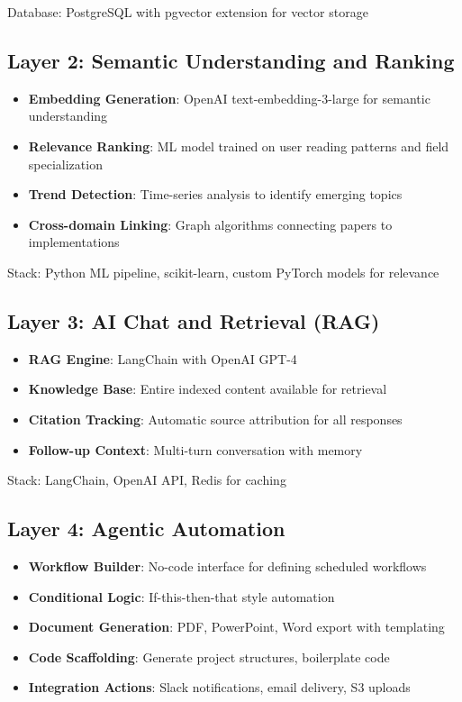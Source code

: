 \documentclass{report}
\begin{document}
Database: PostgreSQL with pgvector extension for vector storage

\subsection{Layer 2: Semantic Understanding and Ranking}

\begin{itemize}
    \item \textbf{Embedding Generation}: OpenAI text-embedding-3-large for semantic understanding
    \item \textbf{Relevance Ranking}: ML model trained on user reading patterns and field specialization
    \item \textbf{Trend Detection}: Time-series analysis to identify emerging topics
    \item \textbf{Cross-domain Linking}: Graph algorithms connecting papers to implementations
\end{itemize}

Stack: Python ML pipeline, scikit-learn, custom PyTorch models for relevance

\subsection{Layer 3: AI Chat and Retrieval (RAG)}

\begin{itemize}
    \item \textbf{RAG Engine}: LangChain with OpenAI GPT-4
    \item \textbf{Knowledge Base}: Entire indexed content available for retrieval
    \item \textbf{Citation Tracking}: Automatic source attribution for all responses
    \item \textbf{Follow-up Context}: Multi-turn conversation with memory
\end{itemize}

Stack: LangChain, OpenAI API, Redis for caching

\subsection{Layer 4: Agentic Automation}

\begin{itemize}
    \item \textbf{Workflow Builder}: No-code interface for defining scheduled workflows
    \item \textbf{Conditional Logic}: If-this-then-that style automation
    \item \textbf{Document Generation}: PDF, PowerPoint, Word export with templating
    \item \textbf{Code Scaffolding}: Generate project structures, boilerplate code
    \item \textbf{Integration Actions}: Slack notifications, email delivery, S3 uploads
\end{itemize}
\end{document}
